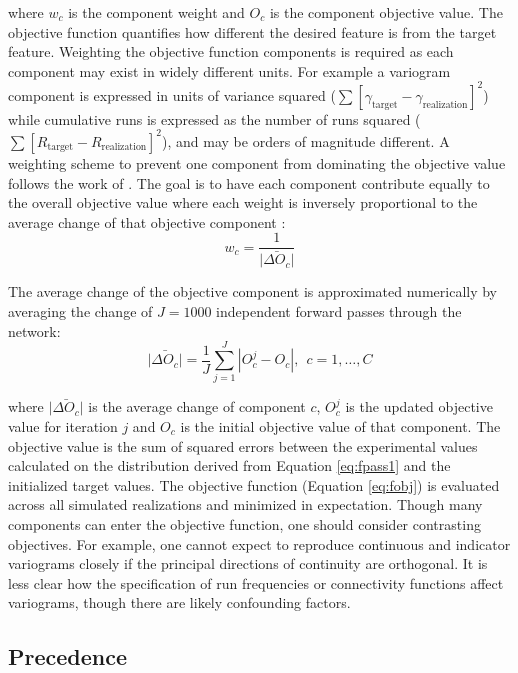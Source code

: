 \lowercase{Where} $w_{c}$ is the component weight and $O_{c}$ is the component objective value. The objective function quantifies how different the desired feature is from the target feature. Weighting the objective function components is required as each component may exist in widely different units. For example a variogram component is expressed in units of variance squared ($\sum [ \gamma_{\text{target}} - \gamma_{\text{realization}}]^{2}$) while cumulative runs is expressed as the number of runs squared ($\sum [ R_{\text{target}} - R_{\text{realization}}]^{2}$), and may be orders of magnitude different. A weighting scheme to prevent one component from dominating the objective value follows the work of \cite{deutsch1992annealing}. The goal is to have each component contribute equally to the overall objective value where each weight is inversely proportional to the average change of that objective component \citep{deutsch1992annealing}:
\begin{equation}
    w_{c} = \frac{1}{\bar{|\Delta O_{c}|}}
    \label{eq:fobj_wt}
\end{equation}

The average change of the objective component is approximated numerically by averaging the change of $J=1000$ independent forward passes through the network:
\begin{equation}
    \bar{|\Delta O_{c}|} = \frac{1}{J} \sum_{j=1}^{J} | O^{j}_{c} - O_{c}|, \ \ c=1,\dots, C
    \label{eq:fobj_avg}
\end{equation}

\lowercase{Where} $\bar{|\Delta O_{c}|}$ is the average change of component $c$, $O^{j}_{c}$ is the updated objective value for iteration $j$ and $O_{c}$ is the initial objective value of that component. The objective value is the sum of squared errors between the experimental values calculated on the distribution derived from Equation \ref{eq:fpass1} and the initialized target values. The objective function (Equation \ref{eq:fobj}) is evaluated across all simulated realizations and minimized in expectation. Though many components can enter the objective function, one should consider contrasting objectives. For example, one cannot expect to reproduce continuous and indicator variograms closely if the principal directions of continuity are orthogonal. It is less clear how the specification of run frequencies or connectivity functions affect variograms, though there are likely confounding factors.

\subsection{Precedence}
\label{subsec:04precedence}

